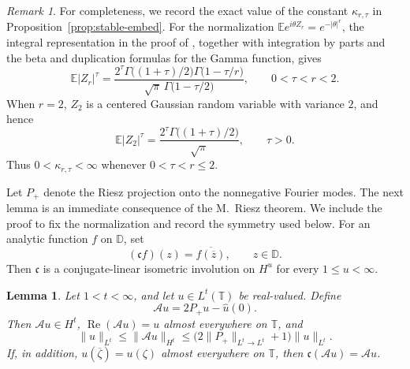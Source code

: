 \documentclass[11pt, reqno]{amsart}
\newtheorem{lemma}[theorem]{Lemma}
\theoremstyle{definition}
\theoremstyle{remark}
\newtheorem{remark}[theorem]{Remark}
\newcommand{\D}{\mathbb{D}}
\newcommand{\T}{\mathbb{T}}
\begin{document}
\begin{remark}
For completeness, we record the exact value of the constant
\(\kappa_{r,\tau}\) in Proposition~\ref{prop:stable-embed}.
For the normalization
\(\mathbb E e^{i\theta Z_r}=e^{-|\theta|^r}\), the integral
representation in the proof of
\cite[Theorem~6.4.16, p.~173]{AlbiacKalton2016}, together with
integration by parts and the beta and duplication formulas for the
Gamma function, gives
\[
        \mathbb E|Z_r|^\tau
        =
        \frac{
        2^\tau
        \Gamma\bigl((1+\tau)/2\bigr)
        \Gamma\bigl(1-\tau/r\bigr)
        }{
        \sqrt{\pi}\,
        \Gamma\bigl(1-\tau/2\bigr)
        },
        \qquad
        0<\tau<r<2.
\]
When \(r=2\), \(Z_2\) is a centered Gaussian random variable with
variance \(2\), and hence
\[
        \mathbb E|Z_2|^\tau
        =
        \frac{
        2^\tau\Gamma\bigl((1+\tau)/2\bigr)
        }{
        \sqrt{\pi}
        },
        \qquad
        \tau>0.
\]
Thus \(0<\kappa_{r,\tau}<\infty\) whenever
\(0<\tau<r\le2\).
\end{remark}

Let \(P_+\) denote the Riesz projection onto the nonnegative Fourier
modes.  The next lemma is an immediate consequence of the M.~Riesz theorem.
We include the proof to fix the normalization and record the symmetry used below.  
For an analytic function \(f\) on \(\D\), set
\[
        (\mathfrak cf)(z)
        =
        \overline{f(\overline z)},
        \qquad
        z\in\D.
\]
Then \(\mathfrak c\) is a conjugate-linear isometric involution on
\(H^u\) for every \(1\le u<\infty\).

\begin{lemma}
\label{lem:real-lift}
Let \(1<t<\infty\), and let \(u\in L^t(\T)\) be real-valued. Define
\[
        \mathcal Au=2P_+u-\widehat u(0).
\]
Then \(\mathcal Au\in H^t\),
\(\operatorname{Re}(\mathcal Au)=u\) almost everywhere on \(\T\), and
\begin{equation}
\label{eq:lift-norm}
        \|u\|_{L^t}
        \le
        \|\mathcal Au\|_{H^t}
        \le
        \bigl(2\|P_+\|_{L^t\to L^t}+1\bigr)\|u\|_{L^t}.
\end{equation}
If, in addition,
\(u(\overline\zeta)=u(\zeta)\) almost everywhere on \(\T\), then
\(\mathfrak c(\mathcal Au)=\mathcal Au\).
\end{lemma}
\end{document}
